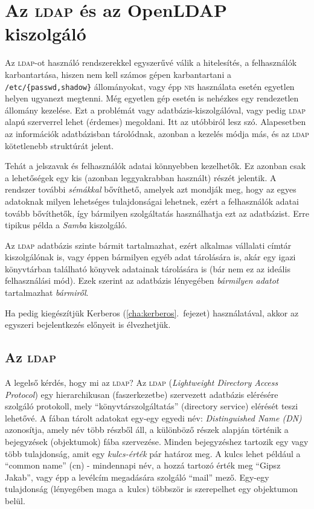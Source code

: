 \chapter{Az \textsc{ldap} és az OpenLDAP kiszolgáló}\label{cha:ldap}

Az \textsc{ldap}-ot használó rendszerekkel egyszerűvé válik a hitelesítés, a felhasználók karbantartása, hiszen nem kell
számos gépen karbantartani a \texttt{/etc/\{passwd,shadow\}} állományokat, vagy épp \textsc{nis} használata esetén
egyetlen helyen ugyanezt megtenni. Még egyetlen gép esetén is nehézkes egy rendezetlen állomány kezelése. Ezt a
problémát vagy adatbázis-kiszolgálóval, vagy pedig \textsc{ldap} alapú szerverrel lehet (érdemes) megoldani. Itt az
utóbbiról lesz szó. Alapesetben az információk adatbázisban tárolódnak, azonban a kezelés módja más, és az \textsc{ldap}
kötetlenebb struktúrát jelent.

Tehát a jelszavak és felhasználók adatai könnyebben kezelhetők. Ez azonban csak a lehetőségek egy kis (azonban
leggyakrabban használt) részét jelentik. A rendszer további \emph{sémákkal} bővíthető, amelyek azt mondják meg, hogy az
egyes adatoknak milyen lehetséges tulajdonságai lehetnek, ezért a felhasználók adatai tovább bővíthetők, így bármilyen
szolgáltatás használhatja ezt az adatbázist. Erre tipikus példa a \emph{Samba} kiszolgáló.

Az \textsc{ldap} adatbázis szinte bármit tartalmazhat, ezért alkalmas vállalati címtár kiszolgálónak is, vagy éppen
bármilyen egyéb adat tárolására is, akár egy igazi könyvtárban található könyvek adatainak tárolására is (bár nem ez az
ideális felhasználási mód). Ezek szerint  az adatbázis lényegében \emph{bármilyen adatot} tartalmazhat
\emph{bármiről}.

Ha pedig kiegészítjük Kerberos (\ref{cha:kerberos}.\ fejezet) használatával, akkor az egyszeri bejelentkezés előnyeit is
élvezhetjük.


\section{Az \textsc{ldap}}

A legelső kérdés, hogy mi az \textsc{ldap}?
Az \textsc{ldap}  ({\em Lightweight Directory Access Protocol}) egy hierarchikusan (faszerkezetbe) szervezett adatbázis
elérésére szolgáló protokoll, mely ``könyvtárszolgáltatás'' (directory service) elérését teszi lehetővé.
A fában tárolt adatokat egy-egy egyedi név: {\em Distinguished Name (DN)} azonosítja,
amely név több részből áll, a  különböző részek alapján történik a bejegyzések (objektumok) fába szervezése. Minden
bejegyzéshez tartozik egy vagy több
tulajdonság, amit egy {\em kulcs-érték} pár határoz meg. A kulcs lehet például a ``common name'' (cn) - mindennapi
név, a hozzá tartozó érték meg ``Gipsz Jakab'', vagy épp a levélcím megadására szolgáló ``mail'' mező. Egy-egy
tulajdonság (lényegében maga a~kulcs) többször is szerepelhet egy objektumon belül.

